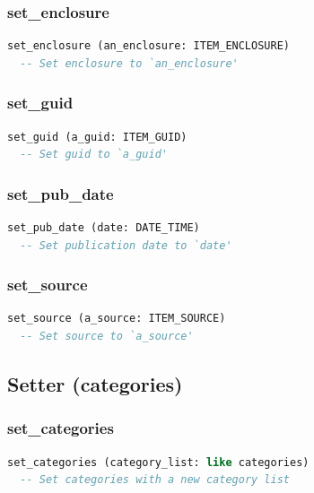 \subsubsection{set\_enclosure}

\begin{lstlisting}[language=Eiffel]
set_enclosure (an_enclosure: ITEM_ENCLOSURE)
  -- Set enclosure to `an_enclosure'
\end{lstlisting}

\subsubsection{set\_guid}

\begin{lstlisting}[language=Eiffel]
set_guid (a_guid: ITEM_GUID)
  -- Set guid to `a_guid'
\end{lstlisting}

\subsubsection{set\_pub\_date}

\begin{lstlisting}[language=Eiffel]
set_pub_date (date: DATE_TIME)
  -- Set publication date to `date'
\end{lstlisting}

\subsubsection{set\_source}

\begin{lstlisting}[language=Eiffel]
set_source (a_source: ITEM_SOURCE)
  -- Set source to `a_source'
\end{lstlisting}

\subsection{Setter (categories)}
\label{sec:item-setter-categories}

\subsubsection{set\_categories}

\begin{lstlisting}[language=Eiffel]
set_categories (category_list: like categories)
  -- Set categories with a new category list
\end{lstlisting}

